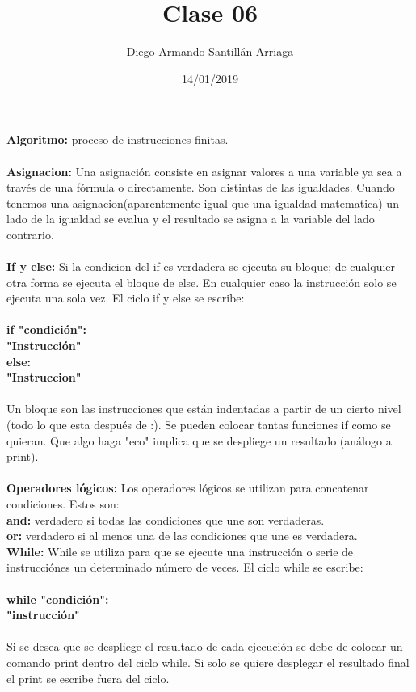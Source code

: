 \documentclass[letter paper, 12pt, oneside]{article}
\title{\Huge Clase 06}
\author{Diego Armando Santillán Arriaga}
\date{14/01/2019}
\begin{document}
	\maketitle
	
\newpage

\textbf{Algoritmo:} proceso de instrucciones finitas.
\\\\
\textbf{Asignacion:}
Una asignación consiste en asignar valores a una variable ya sea a través de una fórmula o directamente. Son distintas de las igualdades. 
Cuando tenemos una asignacion(aparentemente igual que una igualdad matematica) un lado de la igualdad se evalua y el resultado se asigna a la variable del lado contrario.
\\\\
\textbf{If y else:}
Si la condicion del if es verdadera se ejecuta su bloque; de cualquier otra forma se ejecuta el bloque de else. En cualquier caso la instrucción solo se ejecuta una sola vez.
El ciclo if y else se escribe:
\\\\
 \textbf{if "condición":
\\
"Instrucción"
\\
else:
\\"Instruccion"}  \\\\ 
Un bloque son las instrucciones que están indentadas a partir de un cierto nivel (todo lo que esta después de :).
Se pueden colocar tantas funciones if como se quieran. 
Que algo haga "eco" implica que se despliege un resultado (análogo a print). 
\\\\
\textbf{Operadores lógicos:}
Los operadores lógicos se utilizan para concatenar condiciones. Estos son:
\\
\textbf{and:} verdadero si todas las condiciones que une son verdaderas.
\\
\textbf{or:} verdadero si al menos una de las condiciones que une es verdadera. 
\\
\textbf{While:}
While se utiliza para que se ejecute una instrucción o serie de instrucciónes un determinado número de veces. El ciclo while se escribe:
\\\\
\textbf{while "condición":
\\
"instrucción"}
\\\\
Si se desea que  se despliege el resultado de cada ejecución se debe de colocar un comando print dentro del ciclo while. Si solo se quiere desplegar el resultado final el print se escribe fuera del ciclo.  
\end{document}
